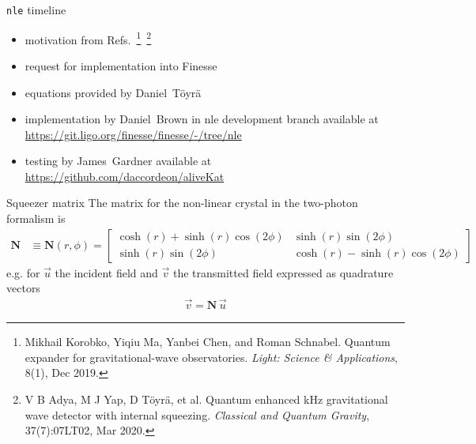 \documentclass[12pt]{beamer}
\newcommand{\code}[1]{\texttt{#1}}
\begin{document}
\begin{frame}{\code{nle} timeline}
\begin{itemize}
\item motivation from Refs.~\footnote{\tiny Mikhail Korobko, Yiqiu Ma, Yanbei Chen, and Roman Schnabel. Quantum expander for gravitational-wave observatories. \emph{Light: Science \& Applications}, 8(1), Dec
2019.}~\footnote{\tiny V B Adya, M J Yap, D Töyrä, et al. Quantum enhanced kHz gravitational wave detector with internal squeezing. \emph{Classical and Quantum Gravity}, 37(7):07LT02, Mar 2020.}
\item request for implementation into Finesse
\item equations provided by Daniel~Töyrä
\item implementation by Daniel~Brown in nle development branch available at {\color{blue}\url{https://git.ligo.org/finesse/finesse/-/tree/nle}}
\item testing by James~Gardner available at {\color{blue}\url{https://github.com/daccordeon/aliveKat}}
\end{itemize}
\end{frame}

\begin{frame}{Squeezer matrix}
The matrix for the non-linear crystal in the two-photon formalism is
{\footnotesize
\begin{align}
\mathbf{N} &\equiv \mathbf{N}(r, \phi) = \begin{bmatrix} \cosh(r) + \sinh(r) \cos(2\phi) & \sinh(r) \sin(2\phi) \\ 
                                            \sinh(r) \sin(2\phi) & \cosh(r) - \sinh(r) \cos(2\phi)
                                            \end{bmatrix}
\end{align}
}
e.g. for $\vec{u}$ the incident field and $\vec{v}$ the transmitted field expressed as quadrature vectors
\begin{align}
\vec{v} = \mathbf{N}\, \vec{u}
\end{align}
\end{frame}
\end{document}
